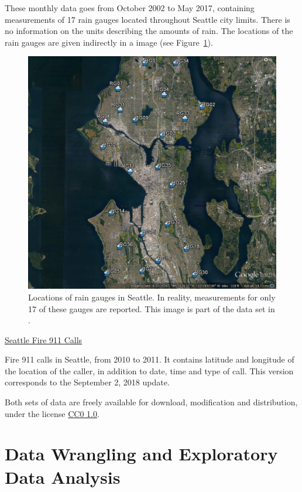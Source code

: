 \documentclass[12pt,a4paper]{article}
\begin{document}
These monthly data goes from October 2002 to May 2017, containing measurements of 17 rain gauges located throughout Seattle city limits. There is no information on the units describing the amounts of rain. The locations of the rain gauges are given indirectly in a image (see Figure~\ref{gauges}).

\begin{figure}[ht!]
\centering
\includegraphics[scale=0.3]{SPU_DWW_RGs.jpg}
\caption{Locations of rain gauges in Seattle. In reality, measurements for only 17 of these gauges are reported. This image is part of the data set in \cite{Daniels2018}.}
\label{gauges}
\end{figure}



{\large \href{https://data.seattle.gov/Public-Safety/Seattle-Fire-911-Calls-from-3-1-2010-to-3-1-2011/d9j6-s59d}{Seattle Fire 911 Calls} \cite{FireData2018}}

Fire 911 calls in Seattle, from 2010 to 2011. It contains latitude and longitude of the location of the caller, in addition to date, time and type of call. This version corresponds to the September 2, 2018 update.

Both sets of data are freely available for download, modification and distribution, under the license \href{https://creativecommons.org/publicdomain/zero/1.0/legalcode}{CC0 1.0}.

\section{Data Wrangling and Exploratory Data Analysis}
\end{document}
